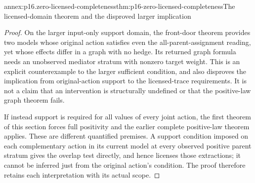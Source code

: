 \begin{annexitem}{annex:p16.zero-licensed-completeness}{thm:p16-zero-licensed-completeness}{The licensed-domain theorem and the disproved larger implication}
\begin{proof}
On the larger input-only support domain, the front-door theorem
provides two models whose original action satisfies even the
all-parent-assignment reading, yet whose effects differ in a
graph with no hedge. Its returned graph formula needs an
unobserved mediator stratum with nonzero target weight. This
is an explicit counterexample to the larger sufficient condition,
and also disproves the implication from original-action support
to the licensed-trace requirements. It is not a claim that an
intervention is structurally undefined or that the positive-law
graph theorem fails.

If instead support is required for all values of every joint
action, the first theorem of this section forces full positivity
and the earlier complete positive-law theorem applies. These
are different quantified premises. A support condition imposed
on each complementary action in its current model at every
observed positive parent stratum gives the overlap test directly, and hence
licenses those extractions; it cannot be inferred just from
the original action's condition. The proof therefore retains
each interpretation with its actual scope.
\end{proof}
\end{annexitem}

